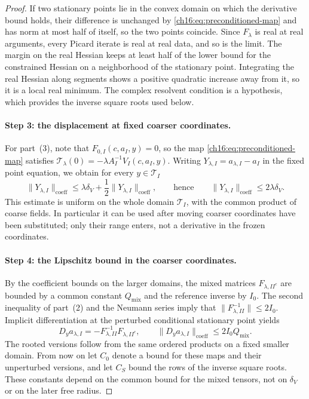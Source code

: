 \begin{proof}
If two stationary points lie in the convex domain on which the derivative bound holds, their difference is unchanged by \eqref{ch16:eq:preconditioned-map} and has norm at most half of itself, so the two points coincide. Since $F_\lambda$ is real at real arguments, every Picard iterate is real at real data, and so is the limit. The margin on the real Hessian keeps at least half of the lower bound for the constrained Hessian on a neighborhood of the stationary point. Integrating the real Hessian along segments shows a positive quadratic increase away from it, so it is a local real minimum. The complex resolvent condition is a hypothesis, which provides the inverse square roots used below.

\paragraph{Step 3: the displacement at fixed coarser coordinates.}
For part~(3), note that $F_{0,I}(c,a_I,y)=0$, so the map \eqref{ch16:eq:preconditioned-map} satisfies $\mathcal T_\lambda(0)=-\lambda A_I^{-1}V_I(c,a_I,y)$. Writing $Y_{\lambda,I}=a_{\lambda,I}-a_I$ in the fixed point equation, we obtain for every $y\in\mathcal T_I$
\begin{equation}\label{ch16:eq:conditional-force-displacement}
 \|Y_{\lambda,I}\|_{\mathrm{coeff}}
 \le\lambda\delta_V+\frac12\|Y_{\lambda,I}\|_{\mathrm{coeff}},
 \qquad\text{hence}\qquad
 \|Y_{\lambda,I}\|_{\mathrm{coeff}}\le2\lambda\delta_V.
\end{equation}
This estimate is uniform on the whole domain $\mathcal T_I$, with the common product of coarse fields. In particular it can be used after moving coarser coordinates have been substituted; only their range enters, not a derivative in the frozen coordinates.

\paragraph{Step 4: the Lipschitz bound in the coarser coordinates.}
By the coefficient bounds on the larger domains, the mixed matrices $F_{\lambda,II^c}$ are bounded by a common constant $Q_{\mathrm{mix}}$ and the reference inverse by $I_0$. The second inequality of part~(2) and the Neumann series imply that $\|F_{\lambda,II}^{-1}\|\le2I_0$. Implicit differentiation at the perturbed conditional stationary point yields
\begin{equation}\label{ch16:eq:conditional-higher-lipschitz}
 D_y a_{\lambda,I}
     =-F_{\lambda,II}^{-1}F_{\lambda,II^c},\qquad
 \|D_y a_{\lambda,I}\|_{\mathrm{coeff}}\le2I_0Q_{\mathrm{mix}}.
\end{equation}
The rooted versions follow from the same ordered products on a fixed smaller domain. From now on let $C_0$ denote a bound for these maps and their unperturbed versions, and let $C_S$ bound the rows of the inverse square roots. These constants depend on the common bound for the mixed tensors, not on $\delta_V$ or on the later free radius.


\end{proof}
